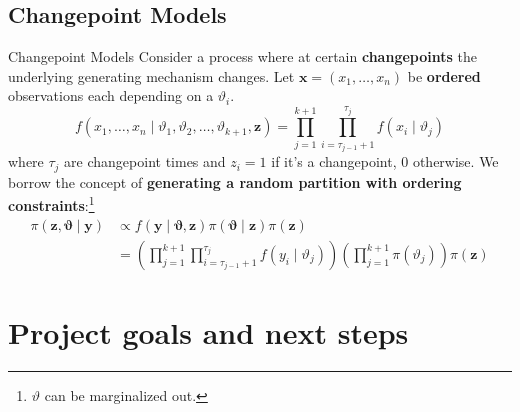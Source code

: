 \subsection{Changepoint Models}
\begin{frame}{Changepoint Models}
    Consider a process where at certain \textbf{changepoints} the underlying generating mechanism changes. Let $\bm{x}=(x_{1},\ldots,x_{n})$ be \textbf{ordered} observations each depending on a $\vartheta_{i}.$\\
    \[
        f(x_{1},\ldots,x_{n} \mid \vartheta_1, \vartheta_2, \ldots, \vartheta_{k+1}, \bm{z})=\prod_{j=1}^{k+1} \prod_{i=\tau_{j-1}+1}^{\tau_j} f(x_i \mid \vartheta_j)
    \]
    where $\tau_j$ are changepoint times and $z_{i} = 1$ if it's a changepoint, $0$ otherwise.
    We borrow the concept of \textbf{generating a random partition with ordering constraints}:\footnote{$\vartheta$ can be marginalized out.}
    \begin{align*}
        \pi(\bm{z}, \bm{\vartheta} \mid \bm{y}) & \propto f(\bm{y} \mid \bm{\vartheta}, \bm{z}) \pi(\bm{\vartheta} \mid \bm{z}) \pi(\bm{z}) \\
        &=\left(\prod_{j=1}^{k+1} \prod_{i=\tau_{j-1}+1}^{\tau_j} f(y_i \mid \vartheta_j)\right)\left(\prod_{j=1}^{k+1} \pi(\vartheta_j)\right) \pi(\bm{z})
    \end{align*}
\end{frame}








\section{Project goals and next steps}


